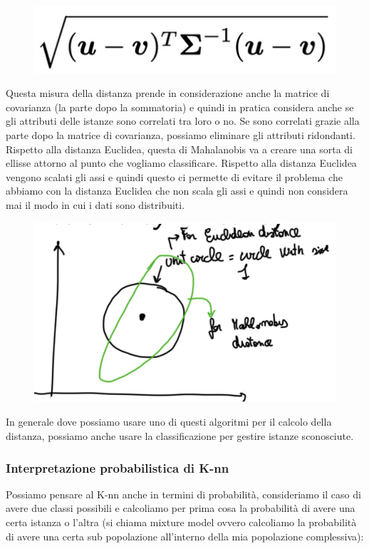 \documentclass[14pt]{extreport}
\begin{document}
\begin{itemize}
\begin{figure}[H] 
	\centering
	\includegraphics[width=0.7\linewidth]{464.jpeg}
	\end{figure}
	Questa misura della distanza prende in considerazione anche la matrice di covarianza (la parte dopo la sommatoria) e quindi in pratica considera anche se gli attributi delle istanze sono correlati tra loro o no.
	Se sono correlati grazie alla parte dopo la matrice di covarianza, possiamo eliminare gli attributi ridondanti.
	Rispetto alla distanza Euclidea, questa di Mahalanobis va a creare una sorta di ellisse attorno al punto che vogliamo classificare.
	Rispetto alla distanza Euclidea vengono scalati gli assi e quindi questo ci permette di evitare il problema che abbiamo con la distanza Euclidea che non scala gli assi e quindi non considera mai il modo in cui i dati sono distribuiti.
	
	\end{itemize} 

	
	\begin{figure}[H] 
	\centering
	\includegraphics[width=0.7\linewidth]{467.jpeg}
	\end{figure}
	In generale dove possiamo usare uno di questi algoritmi per il calcolo della distanza, possiamo anche usare la classificazione per gestire istanze sconosciute.

	\subsubsection{Interpretazione probabilistica di K-nn}

	Possiamo pensare al K-nn anche in termini di probabilità, consideriamo il caso di avere due classi possibili e calcoliamo per prima cosa la probabilità di avere una certa istanza o l’altra (si chiama mixture model ovvero calcoliamo la probabilità di avere una certa sub popolazione all’interno della mia popolazione complessiva):
\end{document}
